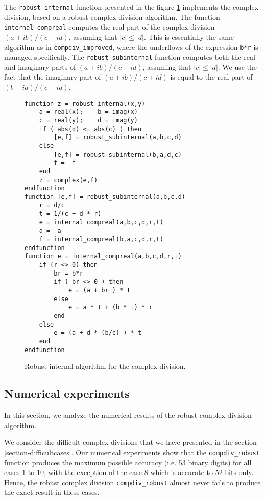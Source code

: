 \documentclass{paper}
\newcommand{\scivar}[1]{\texttt{#1}}
\begin{document}
The \scivar{robust\_internal} function presented in the figure 
\ref{fig-compdiv-algointernal} implements the complex division, based 
on a robust complex division algorithm. 
The function \scivar{internal\_compreal} computes the real 
part of the complex division $(a+ib)/(c+id)$, assuming that 
$|c|\leq |d|$. 
This is essentially the same algorithm as in \scivar{compdiv\_improved}, 
where the underflows of the expression \scivar{b*r} is managed specifically. 
The \scivar{robust\_subinternal} function computes both the 
real and imaginary parts of $(a+ib)/(c+id)$, assuming that 
$|c|\leq |d|$. 
We use the fact that the imaginary part of $(a+ib)/(c+id)$ is 
equal to the real part of $(b-ia)/(c+id)$. 

\begin{figure}
\caption{Robust internal algorithm for the complex division.}
\label{fig-compdiv-algointernal}
\lstset{language=scilabscript}
\begin{lstlisting}
function z = robust_internal(x,y)
    a = real(x);    b = imag(x)
    c = real(y);    d = imag(y)
    if ( abs(d) <= abs(c) ) then
        [e,f] = robust_subinternal(a,b,c,d)
    else
        [e,f] = robust_subinternal(b,a,d,c)
        f = -f
    end
    z = complex(e,f)
endfunction
function [e,f] = robust_subinternal(a,b,c,d)
    r = d/c
    t = 1/(c + d * r)
    e = internal_compreal(a,b,c,d,r,t)
    a = -a
    f = internal_compreal(b,a,c,d,r,t)
endfunction
function e = internal_compreal(a,b,c,d,r,t)
    if (r <> 0) then
        br = b*r
        if ( br <> 0 ) then
            e = (a + br ) * t
        else
            e = a * t + (b * t) * r
        end
    else
        e = (a + d * (b/c) ) * t
    end
endfunction
\end{lstlisting}
\end{figure}




\subsection{Numerical experiments}

In this section, we analyze the numerical results 
of the robust complex division algorithm. 

We consider the difficult complex divisions that we have presented 
in the section \ref{section-difficultcases}. 
Our numerical experiments show that the \scivar{compdiv\_robust} 
function produces the maximum possible accuracy (i.e. 53 binary digits) 
for all cases 1 to 10, with the exception of the case 8 which is accurate 
to 52 bits only.
Hence, the robust complex division \scivar{compdiv\_robust} 
almost never fails to produce the exact result in these cases. 
\end{document}
